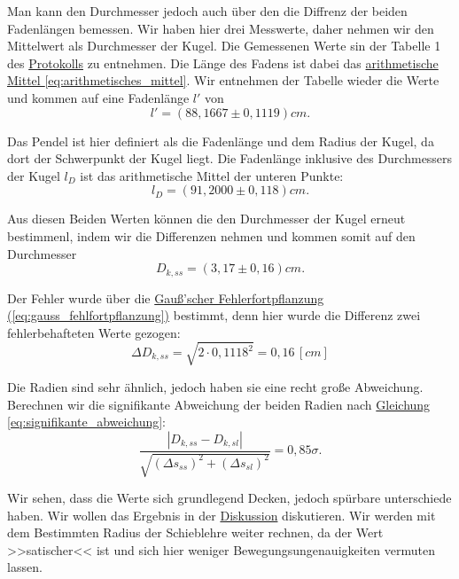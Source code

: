 Man kann den Durchmesser jedoch auch über den die Diffrenz der beiden Fadenlängen bemessen. Wir haben hier drei Messwerte, daher nehmen wir den Mittelwert als Durchmesser der Kugel. Die Gemessenen Werte sin der Tabelle 1 des \hyperref[Protokoll]{Protokolls} zu entnehmen. Die Länge des Fadens ist dabei das \hyperref[eq:arithmetisches_mittel]{arithmetische Mittel \ref*{eq:arithmetisches_mittel}}. Wir entnehmen der Tabelle wieder die Werte und kommen auf eine Fadenlänge $l'$ von
\begin{equation}
    \boxed{
        l' = (88,1667 \pm 0,1119) cm.
    }
\end{equation}

Das Pendel ist hier definiert als die Fadenlänge und dem Radius der Kugel, da dort der Schwerpunkt der Kugel liegt. Die Fadenlänge inklusive des Durchmessers der Kugel $l_D$ ist das arithmetische Mittel der unteren Punkte:
\begin{equation}
    \boxed{
        l_D = (91,2000 \pm 0,118) cm.
    }
\end{equation}

Aus diesen Beiden Werten können die den Durchmesser der Kugel erneut bestimmenl, indem wir die Differenzen nehmen und kommen somit auf den Durchmesser
\begin{equation}
    \boxed{
        D_{k,ss} = (3,17 \pm 0,16)cm.
    }
\end{equation}

Der Fehler wurde über die \hyperref[eq:gauss_fehlfortpflanzung]{Gauß'scher Fehlerfortpflanzung (\ref*{eq:gauss_fehlfortpflanzung})} bestimmt, denn hier wurde die Differenz zwei fehlerbehafteten Werte gezogen:
\begin{equation}
    \Delta D_{k,ss} = \sqrt{2 \cdot 0,1118^2} = 0,16 \, [cm]
\end{equation}

Die Radien sind sehr ähnlich, jedoch haben sie eine recht große Abweichung. Berechnen wir die signifikante Abweichung der beiden Radien nach \hyperref[eq:signifikante_abweichung]{Gleichung \ref*{eq:signifikante_abweichung}}:
\begin{equation}
    \frac{\left| D_{k,ss} - D_{k,sl} \right|}{\sqrt{(\Delta s_{ss})^2 + (\Delta s_{sl})^2 }} = 0,85\sigma.
\end{equation}

Wir sehen, dass die Werte sich grundlegend Decken, jedoch spürbare unterschiede haben. Wir wollen das Ergebnis in der \hyperref[ch:diskussion]{Diskussion} diskutieren. Wir werden mit dem Bestimmten Radius der Schieblehre weiter rechnen, da der Wert >>satischer<< ist und sich hier weniger Bewegungsungenauigkeiten vermuten lassen.

